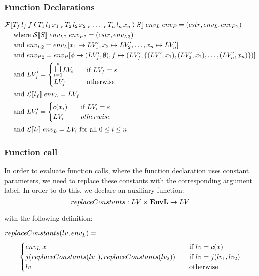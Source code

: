 \subsubsection{Function Declarations}
\begin{align*}
& \iF\dblSq{T_f \, l_f \, f \tk ( T_1 \, l_1 \, x_1 \tk , T_2 \, l_2 \, x_2 \tk , \dots \tk , T_n \, l_n \, x_n \tk ) S} \; \ienvL \; \ienvP
  =  (\icstr, \ienvL, \ienvP_2) \\
& \dsWhere{\iS\dblSq{S} \; \ienvL_2 \; \ienvP_2 = (\icstr, \ienvL_3)} \\
& \dsAnd{\ienvL_2 = \ienvL[x_1 \mapsto \iLV_1', x_2 \mapsto \iLV_2', \dots, x_n \mapsto \iLV_n']} \\
& \dsAnd{\ienvP_2 = \ienvP[\ifb \mapsto (\iLV_f', \emptyset), f \mapsto (\iLV_f', \{(\iLV_1', x_1), (\iLV_2', x_2), \dots, (\iLV_n', x_n)\})]} \\
& \dsAnd{\iLV_f' = \begin{cases}
    \mathlarger\sqcupl_{i = 1}^n \iLV_i & \quad \text{if } \iLV_f = \varepsilon \\
    \iLV_f & \quad \text{otherwise}
  \end{cases}} \\
& \dsAnd{\iL\dblSq{l_f} \; \ienvL = \iLV_f} \\
& \dsAnd{\iLV_i' = \begin{cases}
    c(x_i) & \quad \text{if } \iLV_i = \varepsilon \\
    \iLV_i & \quad otherwise
  \end{cases}} \\
& \dsAnd{\iL\dblSq{l_i} \; \ienvL = \iLV_i \text{ for all } 0 \leq i \leq n}
\end{align*}

\subsubsection{Function call}
In order to evaluate function calls, where the function declaration uses constant parameters, we need to replace these constants with the corresponding argument label.
In order to do this, we declare an auxiliary function:
\[ replaceConstants : LV \times \mathbf{EnvL} \rightarrow LV \]

with the following definition:

$replaceConstants(lv, {env_L}) =$ \\
\[ \begin{cases}
{env_L} \; x & \quad \text{if } lv = c(x) \\
j(replaceConstants(lv_1), replaceConstants(lv_2)) & \quad \text{if } lv = j(lv_1, lv_2) \\
lv & \quad \text{otherwise}
\end{cases} \]

